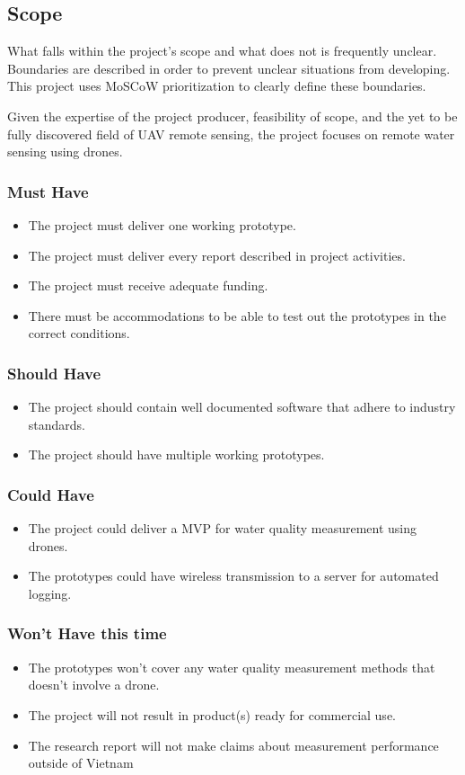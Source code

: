 \newpage
\subsection{Scope}
What falls within the project’s scope and what does not is frequently  unclear. Boundaries are described in order to prevent unclear situations from developing. This project uses \gls{MoSCoW} prioritization to clearly define these boundaries. \cite{moscow}

Given the expertise of the project producer, feasibility of scope, and the yet to be fully discovered field of \gls{UAV} remote sensing, the project focuses on remote water sensing using drones.

\subsubsection{Must Have}
\begin{itemize}
  \item The project must deliver one working prototype.
  \item The project must deliver every report described in project activities.
  \item The project must receive adequate funding.
  \item There must be accommodations to be able to test out the prototypes in the correct conditions.
\end{itemize}
\subsubsection{Should Have}
\begin{itemize}
  \item The project should contain well documented software that adhere to industry standards.
  \item The project should have multiple working prototypes.
\end{itemize}
\subsubsection{Could Have}
\begin{itemize}
  \item The project could deliver a \gls{MVP} for water quality measurement using drones.
  \item The prototypes could have wireless transmission to a server for automated logging.
\end{itemize}
\subsubsection{Won’t Have this time}
\begin{itemize}
  \item The prototypes won't cover any water quality measurement methods that doesn't involve a drone.
  \item The project will not result in product(s) ready for commercial use.
  \item The research report will not make claims about measurement performance outside of Vietnam
\end{itemize}